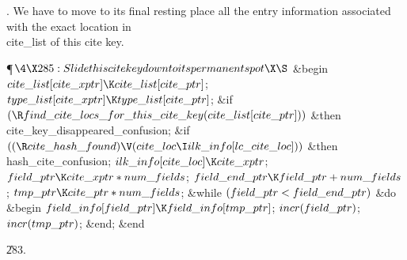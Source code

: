 .
We have to move to its final resting place all the entry information
associated with the exact location in \\{cite\_list} of this cite key.

\Y\P$\4\X285:Slide this cite key down to its permanent spot\X\S$\6
\&{begin} $\\{cite\_list}[\\{cite\_xptr}]\K\\{cite\_list}[\\{cite\_ptr}]$;\5
$\\{type\_list}[\\{cite\_xptr}]\K\\{type\_list}[\\{cite\_ptr}]$;\6
\&{if} $(\R\\{find\_cite\_locs\_for\_this\_cite\_key}(\\{cite\_list}[\\{cite%
\_ptr}]))$ \1\&{then}\5
\\{cite\_key\_disappeared\_confusion};\2\6
\&{if} $((\R\\{cite\_hash\_found})\V(\\{cite\_loc}\I\\{ilk\_info}[\\{lc\_cite%
\_loc}]))$ \1\&{then}\5
\\{hash\_cite\_confusion};\2\6
$\\{ilk\_info}[\\{cite\_loc}]\K\\{cite\_xptr}$;\6
$\\{field\_ptr}\K\\{cite\_xptr}\ast\\{num\_fields}$;\5
$\\{field\_end\_ptr}\K\\{field\_ptr}+\\{num\_fields}$;\5
$\\{tmp\_ptr}\K\\{cite\_ptr}\ast\\{num\_fields}$;\6
\&{while} $(\\{field\_ptr}<\\{field\_end\_ptr})$ \1\&{do}\6
\&{begin} $\\{field\_info}[\\{field\_ptr}]\K\\{field\_info}[\\{tmp\_ptr}]$;\5
$\\{incr}(\\{field\_ptr})$;\5
$\\{incr}(\\{tmp\_ptr})$;\6
\&{end};\2\6
\&{end}\par
\U283.\fi

